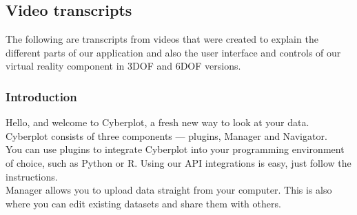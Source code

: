 \documentclass{article}
\begin{document}
\begin{table}[!h]
\centering
\caption{Excerpt of used operators.\cite{klm}}
\label{klm}
\end{table}

\subsection{Video transcripts}

The following are transcripts from videos that were created to explain the different parts of our application and also the user interface and controls of our virtual reality component in 3DOF and 6DOF versions.

\subsubsection{Introduction}

Hello, and welcome to Cyberplot, a fresh new way to look at your data. Cyberplot consists of three components --- plugins, Manager and Navigator.\\

You can use plugins to integrate Cyberplot into your programming environment of choice, such as Python or R. Using our API integrations is easy, just follow the instructions.\\

Manager allows you to upload data straight from your computer. This is also where you can edit existing datasets and share them with others.\\
\end{document}
